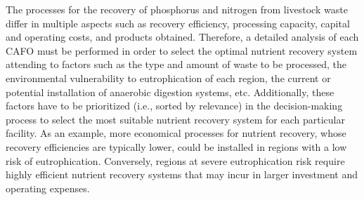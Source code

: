 \begin{refsection}[referencesCh1]
The processes for the recovery of phosphorus and nitrogen from livestock waste differ in multiple aspects such as recovery efficiency, processing capacity, capital and operating costs, and products obtained. Therefore, a detailed analysis of each CAFO must be performed in order to select the optimal nutrient recovery system attending to factors such as the type and amount of waste to be processed, the environmental vulnerability to eutrophication of each region, the current or potential installation of anaerobic digestion systems, etc. Additionally, these factors have to be prioritized (i.e., sorted by relevance) in the decision-making process to select the most suitable nutrient recovery system for each particular facility. As an example,
more economical processes for nutrient recovery, whose recovery efficiencies are typically lower, could be installed in regions with a low risk of eutrophication.
Conversely, regions at severe eutrophication risk require highly efficient nutrient recovery systems that may incur in larger investment and operating expenses.


\end{refsection}
